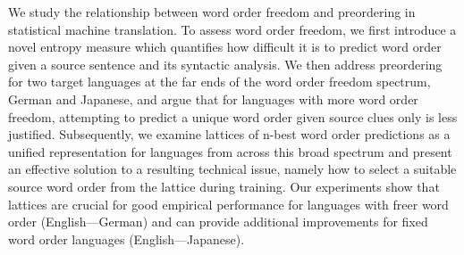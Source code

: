 We study the relationship between word order freedom and preordering in statistical machine translation. To assess word order freedom, we first introduce a novel entropy measure which quantifies how difficult it is to predict word order given a source sentence and its syntactic analysis. We then address preordering for two target languages at the far ends of the word order freedom spectrum, German and Japanese, and argue that for languages with more word order freedom, attempting to predict a unique word order given source clues only is less justified. Subsequently, we examine lattices of n-best word order predictions as a unified representation for languages from across this broad spectrum and present an effective solution to a resulting technical issue, namely how to select a suitable source word order from the lattice during training. Our experiments show that lattices are crucial for good empirical performance for languages with freer word order (English---German) and can provide additional improvements for fixed word order languages (English---Japanese).

